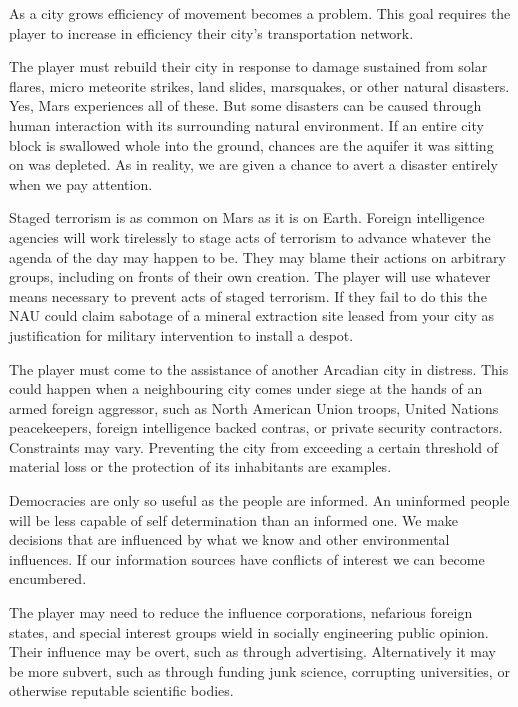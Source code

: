 As a city grows efficiency of movement becomes a problem. This goal requires the player to increase in efficiency their city's transportation network.


The player must rebuild their city in response to damage sustained from solar flares, micro meteorite strikes, land slides, marsquakes, or other natural disasters. Yes, Mars experiences all of these. But some  disasters can be caused through human interaction with its surrounding natural environment. If an entire city block is swallowed whole into the ground, chances are the aquifer it was sitting on was depleted. As in reality, we are given a chance to avert a disaster entirely when we pay attention.


Staged terrorism is as common on Mars as it is on Earth. Foreign intelligence agencies will work tirelessly to stage acts of terrorism to advance whatever the agenda of the day may happen to be. They may blame their actions on arbitrary groups, including on fronts of their own creation. The player will use whatever means necessary to prevent acts of staged terrorism. If they fail to do this the NAU could claim sabotage of a mineral extraction site leased from your city as justification for military intervention to install a despot.


The player must come to the assistance of another Arcadian city in distress. This could happen when a neighbouring city comes under siege at the hands of an armed foreign aggressor, such as North American Union troops, United Nations peacekeepers, foreign intelligence backed contras, or private security contractors. Constraints may vary. Preventing the city from exceeding a certain threshold of material loss or the protection of its inhabitants are examples.


Democracies are only so useful as the people are informed. An uninformed people will be less capable of self determination than an informed one. We make decisions that are influenced by what we know and other environmental influences. If our information sources have conflicts of interest we can become encumbered.

The player may need to reduce the influence corporations, nefarious foreign states, and special interest groups wield in socially engineering public opinion. Their influence may be overt, such as through advertising. Alternatively it may be more subvert, such as through funding junk science, corrupting universities, or otherwise reputable scientific bodies.

